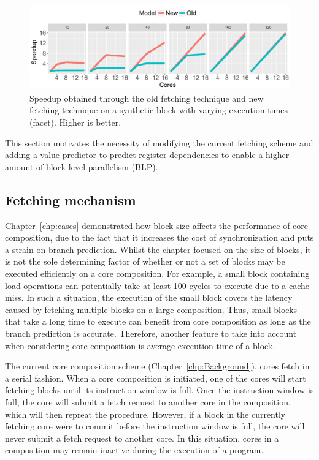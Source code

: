 \begin{figure}[t]
    \centering
    \includegraphics[width=1\textwidth]{chapter3/graphics/motivation_fetch.pdf}

    \caption{Speedup obtained through the old fetching technique and new fetching technique on a synthetic block with varying execution times (facet). Higher is better.}
    \label{fig:motivation_fetch}
	\vspace{1em}
\end{figure}

This section motivates the necessity of modifying the current fetching scheme and adding a value predictor to predict register dependencies to enable a higher amount of block level parallelism (BLP).

\subsection{Fetching mechanism}
Chapter~\ref{chp:cases} demonstrated how block size affects the performance of core composition, due to the fact that it increases the cost of synchronization and puts a strain on branch prediction.
Whilst the chapter focused on the size of blocks, it is not the sole determining factor of whether or not a set of blocks may be executed efficiently on a core composition.
For example, a small block containing load operations can potentially take at least 100 cycles to execute due to a cache miss.
In such a situation, the execution of the small block covers the latency caused by fetching multiple blocks on a large composition.
Thus, small blocks that take a long time to execute can benefit from core composition as long as the branch prediction is accurate.
Therefore, another feature to take into account when considering core composition is average execution time of a block.

The current core composition scheme (Chapter~\ref{chp:Background}), cores fetch in a serial fashion.
When a core composition is initiated, one of the cores will start fetching blocks until its instruction window is full.
Once the instruction window is full, the core will submit a fetch request to another core in the composition, which will then repreat the procedure.
However, if a block in the currently fetching core were to commit before the instruction window is full, the core will never submit a fetch request to another core.
In this situation, cores in a composition may remain inactive during the execution of a program.

